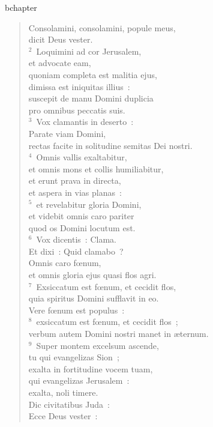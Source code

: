 bchapter\begin{verse}\vspace{-19pt}Consolamini, consolamini, popule meus,\\ dicit Deus vester.\\
${}^{2}$~Loquimini ad cor Jerusalem,\\ et advocate eam,\\ quoniam completa est malitia ejus,\\ dimissa est iniquitas illius~:\\ suscepit de manu Domini duplicia\\ pro omnibus peccatis suis.\\
${}^{3}$~Vox clamantis in deserto~:\\ Parate viam Domini,\\ rectas facite in solitudine semitas Dei nostri.\\
${}^{4}$~Omnis vallis exaltabitur,\\ et omnis mons et collis humiliabitur,\\ et erunt prava in directa,\\ et aspera in vias planas~:\\
${}^{5}$~et revelabitur gloria Domini,\\ et videbit omnis caro pariter\\ quod os Domini locutum est.\\
${}^{6}$~Vox dicentis~: Clama.\\ Et dixi~: Quid clamabo~?\\ Omnis caro fœnum,\\ et omnis gloria ejus quasi flos agri.\\
${}^{7}$~Exsiccatum est fœnum, et cecidit flos,\\ quia spiritus Domini sufflavit in eo.\\ Vere fœnum est populus~:\\
${}^{8}$~exsiccatum est fœnum, et cecidit flos~;\\ verbum autem Domini nostri manet in \ae ternum.\\
${}^{9}$~Super montem excelsum ascende,\\ tu qui evangelizas Sion~;\\ exalta in fortitudine vocem tuam,\\ qui evangelizas Jerusalem~:\\ exalta, noli timere.\\ Dic civitatibus Juda~:\\ Ecce Deus vester~:\\

\end{verse}
